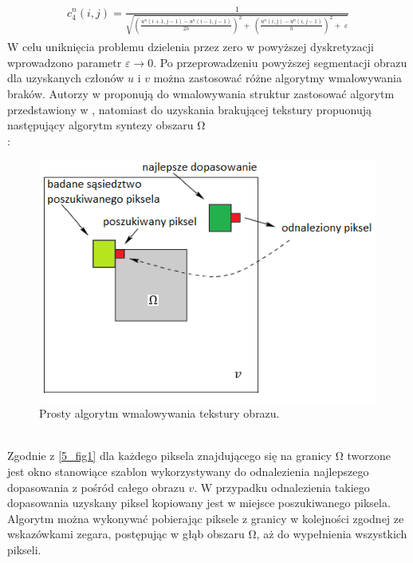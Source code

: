 \documentclass[12pt, twoside, openany]{report}
\theoremstyle{definition}
\begin{document}
\begin{align}
\begin{aligned}
c^n_4\left(i,j\right)=\frac{1}{\sqrt{{\left(\frac{u^n\left(i+1,j-1\right)-u^n\left(i-1,j-1\right)}{2h}\right)}^2+\ {\left(\frac{u^n\left(i,j\right)-u^n\left(i,j-1\right)}{h}\right)}^2+\ \varepsilon }}
\end{aligned}
\end{align}
W celu uniknięcia problemu dzielenia przez zero w powyższej dyskretyzacji wprowadzono parametr $\varepsilon \longrightarrow 0$. 
Po przeprowadzeniu powyższej segmentacji obrazu dla uzyskanych członów $u$ i $v$ można zastosować różne algorytmy wmalowywania braków. Autorzy w \cite{NavierStokesAndTexturePropagation} proponują do wmalowywania struktur zastosować algorytm przedstawiony w \cite{bertalmio2000image}, natomiast do uzyskania brakującej tekstury propuonują następujący algorytm syntezy obszaru $\mathrm{\Omega }$ \\:
\begin{figure}[!h]
	\centering
	\includegraphics[scale=1]{rysunki/5_fig1}
	\caption{Prosty algorytm wmalowywania tekstury obrazu.}
	\label{5_fig1}
\end{figure} \\
Zgodnie z \autoref{5_fig1} dla każdego piksela znajdującego się na granicy $\mathrm{\Omega }$ tworzone jest okno stanowiące szablon wykorzystywany do odnalezienia najlepszego dopasowania z pośród całego obrazu $v$. W przypadku odnalezienia takiego dopasowania uzyskany piksel kopiowany jest w miejsce poszukiwanego piksela. Algorytm można wykonywać pobierając piksele z granicy w kolejności zgodnej ze wskazówkami zegara, postępując w głąb obszaru $\mathrm{\Omega }$, aż do wypełnienia wszystkich pikseli. 
\end{document}
